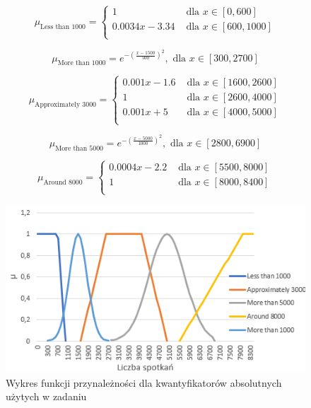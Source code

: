 \documentclass{classrep}
\begin{document}
  
 \begin{equation}
  \mu_{\text{Less than 1000}} =
    \begin{cases}
      1 & \text{ dla } x \in [0,600] \\
      0.0034x - 3.34 & \text{ dla } x \in [600,1000] \\
    \end{cases}  
\end{equation}

\begin{equation}
  \mu_{\text{More than 1000}} = e^{-(\frac{x-1500}{500})^2}, \text{ dla } x \in [300,2700]
\end{equation}

\begin{equation}
  \mu_{\text{Approximately 3000}} =
    \begin{cases}
      0.001x - 1.6 & \text{ dla } x \in [1600,2600] \\
      1 & \text{ dla } x \in [2600,4000] \\
      0.001x +5 & \text{ dla } x \in [4000,5000] \\
    \end{cases}  
\end{equation}

\begin{equation}
  \mu_{\text{More than 5000}} =e^{-(\frac{x-5000}{1000})^2}, \text{ dla } x \in [2800,6900]
\end{equation}

\begin{equation}
  \mu_{\text{Around 8000}} =
    \begin{cases}
      0.0004x - 2.2 & \text{ dla } x \in [5500,8000] \\
      1 & \text{ dla } x \in [8000,8400] \\
    \end{cases}  
\end{equation}

 \begin{figure}[H]
  \includegraphics{absolute.PNG}
  \caption{Wykres funkcji przynależności dla kwantyfikatorów absolutnych użytych w zadaniu}
\end{figure}
\end{document}
